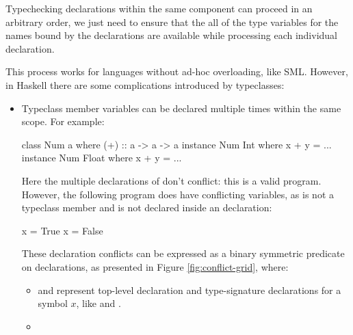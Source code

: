 \documentclass[dissertation.tex]{subfiles}
\begin{document}
{{{            Typechecking declarations within the same component can proceed in an arbitrary order, we just need to
            ensure that the all of the type variables for the names bound by the declarations are available while
            processing each individual declaration.

            This process works for languages without ad-hoc overloading, like SML. However, in Haskell there are some
            complications introduced by typeclasses:

            \begin{itemize}
            \item
            {
                Typeclass member variables can be declared multiple times within the same scope. For example:
                
                \begin{haskellfigure}
                class Num a where
                    (+) :: a -> a -> a
                instance Num Int where
                    x + y = ...
                instance Num Float where
                    x + y = ...
                \end{haskellfigure}

                Here the multiple declarations of \haskell{(+)} don't conflict: this is a valid program. However, the
                following program does have conflicting variables, as  is not a typeclass member and is not
                declared inside an  declaration:

                \begin{haskellfigure}
                x = True
                x = False
                \end{haskellfigure}

                These declaration conflicts can be expressed as a binary symmetric predicate on declarations, as
                presented in Figure \ref{fig:conflict-grid}, where:

                \begin{itemize}
                \item
                {

                     and  represent top-level declaration and
                    type-signature declarations for a symbol \(x\), like  and .

                }
                \item
                {
                    
}
\end{itemize}}
\end{itemize}}}}
\end{document}
